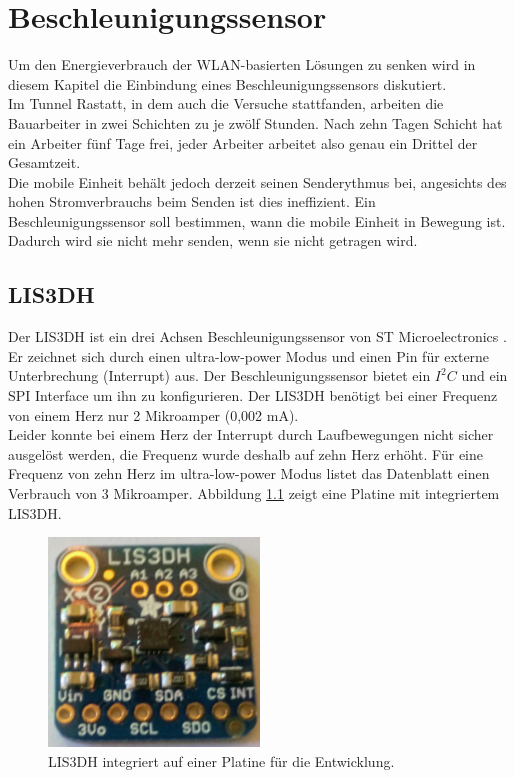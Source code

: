 \chapter{Beschleunigungssensor}
\label{ch:Beschleunigungssensor}
Um den Energieverbrauch der WLAN-basierten Lösungen zu senken wird in diesem Kapitel die Einbindung eines Beschleunigungssensors diskutiert. \\
Im Tunnel Rastatt, in dem auch die Versuche stattfanden, arbeiten die Bauarbeiter in zwei Schichten zu je zwölf Stunden. 
Nach zehn Tagen Schicht hat ein Arbeiter fünf Tage frei, jeder Arbeiter arbeitet also genau ein Drittel der Gesamtzeit. \\
Die mobile Einheit behält jedoch derzeit seinen Senderythmus bei, angesichts des hohen Stromverbrauchs beim Senden ist dies ineffizient.
Ein Beschleunigungssensor soll bestimmen, wann die mobile Einheit in Bewegung ist. 
Dadurch wird sie nicht mehr senden, wenn sie nicht getragen wird.

\section{LIS3DH}
Der LIS3DH ist ein drei Achsen Beschleunigungssensor von ST Microelectronics \cite{st2015lis}.
Er zeichnet sich durch einen ultra-low-power Modus und einen Pin für externe Unterbrechung (Interrupt) aus.
Der Beschleunigungssensor bietet ein $I^2C$ und ein SPI Interface um ihn zu konfigurieren.
Der LIS3DH benötigt bei einer Frequenz von einem Herz nur 2 Mikroamper (0,002 mA).\\
Leider konnte bei einem Herz der Interrupt durch Laufbewegungen nicht sicher ausgelöst werden, die Frequenz wurde deshalb auf zehn Herz erhöht.
Für eine Frequenz von zehn Herz im ultra-low-power Modus listet das Datenblatt einen Verbrauch von 3 Mikroamper.
Abbildung \ref{fig:lis3dh} zeigt eine Platine mit integriertem LIS3DH.

\begin{figure}[h]
  \centering
	\includegraphics[width=0.5\textwidth]{images/lis3dh.jpg}
  \caption{LIS3DH integriert auf einer Platine für die Entwicklung.}
  \label{fig:lis3dh}
\end{figure}

